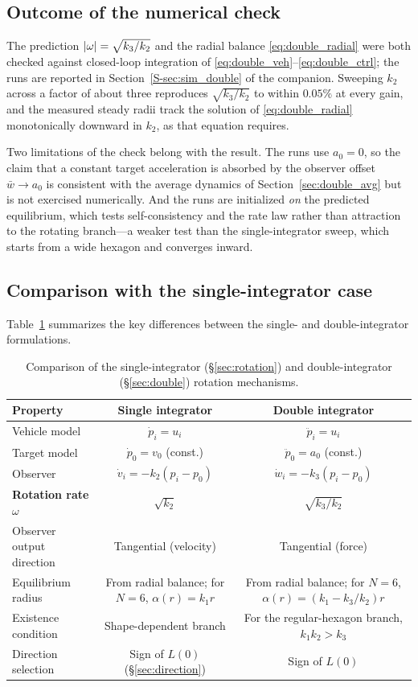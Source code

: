 \subsection{Outcome of the numerical check}
\label{sec:double_num}

The prediction $\left| \omega \right|=\sqrt{k_3/k_2}$ and the radial balance \eqref{eq:double_radial} were both
checked against closed-loop integration of
\eqref{eq:double_veh}--\eqref{eq:double_ctrl}; the runs are reported in
Section~\ref{S-sec:sim_double} of the companion. Sweeping $k_2$ across a factor of about three
reproduces $\sqrt{k_3/k_2}$ to within $0.05\%$ at every gain, and the measured steady radii track the
solution of \eqref{eq:double_radial} monotonically downward in $k_2$, as that equation requires.

Two limitations of the check belong with the result. The runs use $a_0=0$, so the claim that a constant
target acceleration is absorbed by the observer offset $\bar w\to a_0$ is consistent with the average
dynamics of Section~\ref{sec:double_avg} but is not exercised numerically. And the runs are
initialized \emph{on} the predicted equilibrium, which tests self-consistency and the rate law rather
than attraction to the rotating branch---a weaker test than the single-integrator sweep, which starts
from a wide hexagon and converges inward.

\subsection{Comparison with the single-integrator case}
\label{sec:double_compare}

Table~\ref{tab:double_compare} summarizes the key differences between the single- and
double-integrator formulations.

\begin{table}[htbp]
\centering
\caption{Comparison of the single-integrator (\S\ref{sec:rotation}) and double-integrator
(\S\ref{sec:double}) rotation mechanisms.}
\label{tab:double_compare}
\begin{tabular}{lcc}
\toprule
Property & Single integrator & Double integrator \\
\midrule
Vehicle model & $\dot{p}_i=u_i$ & $\ddot{p}_i=u_i$ \\
Target model & $\dot{p}_0=v_0$ (const.) & $\ddot{p}_0=a_0$ (const.) \\
Observer & $\dot{v}_i=-k_2(p_i-p_0)$ & $\dot{w}_i=-k_3(p_i-p_0)$ \\
\textbf{Rotation rate $\omega$} & $\sqrt{k_2}$ & $\sqrt{k_3/k_2}$ \\
Observer output direction & Tangential (velocity) & Tangential (force) \\
Equilibrium radius & From radial balance; for $N=6$, $\alpha(r)=k_1r$ & From radial balance; for $N=6$, $\alpha(r)=(k_1-k_3/k_2)r$ \\
Existence condition & Shape-dependent branch & For the regular-hexagon branch, $k_1k_2>k_3$ \\
Direction selection & Sign of $L(0)$ (\S\ref{sec:direction}) & Sign of $L(0)$ \\
\bottomrule
\end{tabular}
\end{table}

